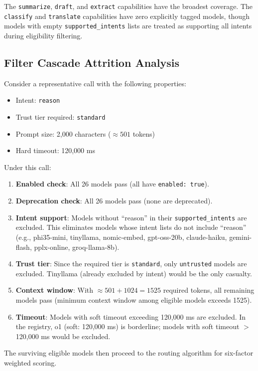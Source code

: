 \documentclass[11pt,a4paper]{article}
\theoremstyle{plain}
\theoremstyle{definition}
\begin{document}
The \texttt{summarize}, \texttt{draft}, and \texttt{extract} capabilities have
the broadest coverage. The \texttt{classify} and \texttt{translate} capabilities
have zero explicitly tagged models, though models with empty
\texttt{supported\_intents} lists are treated as supporting all intents during
eligibility filtering.

\subsection{Filter Cascade Attrition Analysis}

Consider a representative call with the following properties:
\begin{itemize}[leftmargin=2em]
\item Intent: \texttt{reason}
\item Trust tier required: \texttt{standard}
\item Prompt size: 2,000 characters ($\approx 501$ tokens)
\item Hard timeout: 120,000 ms
\end{itemize}

Under this call:
\begin{enumerate}
\item \textbf{Enabled check}: All 26 models pass (all have
  \texttt{enabled: true}).
\item \textbf{Deprecation check}: All 26 models pass (none are deprecated).
\item \textbf{Intent support}: Models without ``reason'' in their
  \texttt{supported\_intents} are excluded. This eliminates models whose intent
  lists do not include ``reason'' (e.g., phi35-mini, tinyllama, nomic-embed,
  gpt-oss-20b, claude-haiku, gemini-flash, pplx-online, groq-llama-8b).
\item \textbf{Trust tier}: Since the required tier is \texttt{standard}, only
  \texttt{untrusted} models are excluded. Tinyllama (already excluded by intent)
  would be the only casualty.
\item \textbf{Context window}: With $\approx 501 + 1024 = 1525$ required tokens,
  all remaining models pass (minimum context window among eligible models
  exceeds 1525).
\item \textbf{Timeout}: Models with soft timeout exceeding 120,000 ms are
  excluded. In the registry, o1 (soft: 120,000 ms) is borderline; models
  with soft timeout $>$ 120,000 ms would be excluded.
\end{enumerate}

The surviving eligible models then proceed to the routing algorithm for
six-factor weighted scoring.
\end{document}
